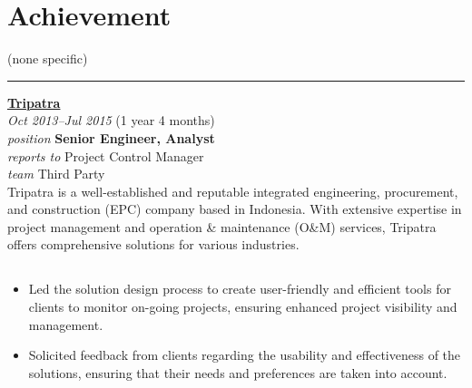\documentclass[12pt]{res}
\begin{document}
\begin{resume}
\begin{minipage}[t]{0.42\linewidth}
	\section{Achievement}
	\begin{flushleft}
        \begin{itemize}
		\footnotesize{(none specific)}
        \end{itemize}
	\end{flushleft}
\end{minipage}

\vspace{10pt}
\rule{1.0\textwidth}{0.1pt}

\begin{multicols}{2}
	{\large {\bf \href{https://tripatra.com}{Tripatra}}} \\
	{\footnotesize{\sl Oct 2013--Jul 2015} \hfill (1 year 4 months)}\\
	{\footnotesize{\sl position} \hfill \bf{Senior Engineer, Analyst}}\\
	{\footnotesize{\sl reports to} \hfill Project Control Manager}\\
	{\footnotesize{\sl team} \hfill Third Party}\\

	\columnbreak
	{\footnotesize{Tripatra is a well-established and reputable integrated engineering, procurement, and construction (EPC) company based in Indonesia. With extensive expertise in project management and operation \& maintenance (O\&M) services, Tripatra offers comprehensive solutions for various industries.}}\\
\end{multicols}
\vspace{-20pt}

\begin{multicols}{2}
	\section{}
		\begin{itemize}
			\item Led the solution design process to create user-friendly and efficient tools for clients to monitor on-going projects, ensuring enhanced project visibility and management.

\item Solicited feedback from clients regarding the usability and effectiveness of the solutions, ensuring that their needs and preferences are taken into account.


\end{itemize}
\end{multicols}
\end{resume}
\end{document}
